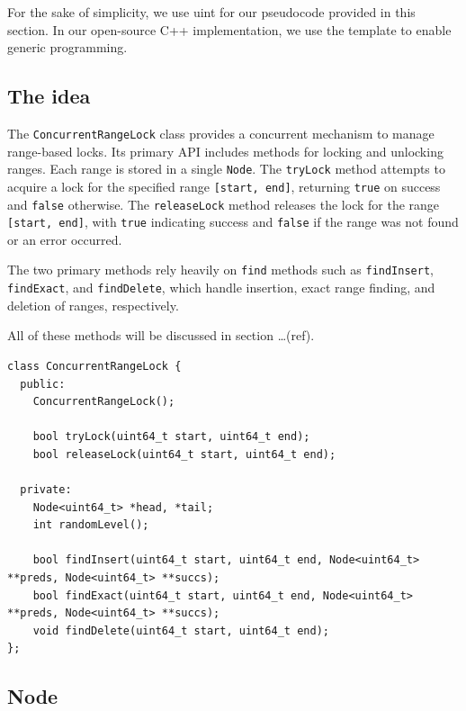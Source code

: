 For the sake of simplicity, we use uint for our pseudocode provided in this section.
In our open-source C++ implementation, we use the template to enable generic programming.

\subsection{The idea}\label{subsec:the-idea}

The \texttt{ConcurrentRangeLock} class provides a concurrent mechanism to manage range-based locks.
Its primary API includes methods for locking and unlocking ranges.
Each range is stored in a single \texttt{Node}.
The \texttt{tryLock} method attempts to acquire a lock for the specified range \texttt{[start, end]}, returning \texttt{true} on success and \texttt{false} otherwise.
The \texttt{releaseLock} method releases the lock for the range \texttt{[start, end]}, with \texttt{true} indicating success and \texttt{false} if the range was not found or an error occurred.

The two primary methods rely heavily on \texttt{find} methods such as \texttt{findInsert}, \texttt{findExact}, and \texttt{findDelete}, which handle insertion, exact range finding, and deletion of ranges, respectively.

All of these methods will be discussed in section \ldots (ref).

\begin{lstlisting}[style=mystyle, caption=Concurrent Range Lock,label={}]
class ConcurrentRangeLock {
  public:
    ConcurrentRangeLock();

    bool tryLock(uint64_t start, uint64_t end);
    bool releaseLock(uint64_t start, uint64_t end);

  private:
    Node<uint64_t> *head, *tail;
    int randomLevel();

    bool findInsert(uint64_t start, uint64_t end, Node<uint64_t> **preds, Node<uint64_t> **succs);
    bool findExact(uint64_t start, uint64_t end, Node<uint64_t> **preds, Node<uint64_t> **succs);
    void findDelete(uint64_t start, uint64_t end);
};
\end{lstlisting}

\subsection{Node}\label{subsec:node}

